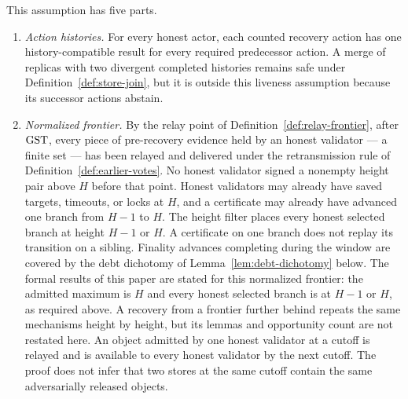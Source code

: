 \begin{assumption}\label{ass:frontier-opportunities}
This assumption has five parts.
\begin{enumerate}
\item \emph{Action histories.}
For every honest actor, each counted recovery action has one
history-compatible result for every required predecessor action.  A merge of
replicas with two divergent completed histories remains safe under
Definition~\ref{def:store-join}, but it is outside this liveness assumption
because its successor actions abstain.

\item \emph{Normalized frontier.}
By the relay point of Definition~\ref{def:relay-frontier}, after
\(\mathrm{GST}\), every piece of pre-recovery evidence held by an honest
validator --- a finite set --- has been relayed and delivered under
the retransmission rule of Definition~\ref{def:earlier-votes}.  No
honest validator signed a nonempty height pair above \(H\) before
that point.  Honest validators may already have saved targets,
timeouts, or locks at \(H\), and a certificate may already have
advanced one branch from \(H-1\) to \(H\).  The height filter
places every honest selected branch at height \(H-1\) or \(H\).
A certificate on one branch does not replay its transition on a
sibling.  Finality advances completing during the window are covered
by the debt dichotomy of Lemma~\ref{lem:debt-dichotomy} below.  The
formal results of this paper are stated for this normalized frontier:
the admitted maximum is \(H\) and every honest selected branch is at
\(H-1\) or \(H\), as required above.  A recovery from a frontier
further behind repeats the same mechanisms height by height, but its
lemmas and opportunity count are not restated here.  An object
admitted by one honest validator at a cutoff is relayed and is
available to every honest validator by the next cutoff.  The proof
does not infer that two stores at the same cutoff contain the same
adversarially released objects.


\end{enumerate}
\end{assumption}
